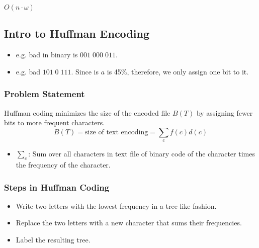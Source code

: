 \begin{definition}
    $O(n\cdot \omega)$
\end{definition}

\subsection{Intro to Huffman Encoding}
\begin{intuition}
    \begin{itemize}
        \item e.g. bad in binary is $001 \; 000 \; 011$.
    \end{itemize}
    \begin{itemize}
        \item e.g. bad $101 \; 0 \; 111$. Since is $a$ is 45\%, therefore, we only assign one bit to it. 
    \end{itemize}
\end{intuition}

\subsubsection{Problem Statement}
\begin{definition}
Huffman coding minimizes the size of the encoded file $B(T)$ by assigning fewer bits to more frequent characters.
\begin{equation*}
    B(T) = \text{size of text encoding} = \sum_c f(c)d(c) 
\end{equation*}
\begin{itemize}
    \item $\sum_c$: Sum over all characters in text file of binary code of the character times the frequency of the character.
\end{itemize}
\end{definition}

\subsubsection{Steps in Huffman Coding}
\begin{itemize}
    \item Write two letters with the lowest frequency in a tree-like fashion.
    \item Replace the two letters with a new character that sums their frequencies.
    \item Label the resulting tree.
\end{itemize}

